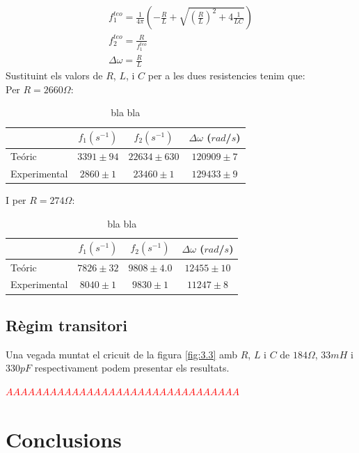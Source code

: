 \documentclass[a4paper,10.5pt]{report}
\begin{document}
\begin{eqnarray}
	f_1^{teo} = \frac{1}{4\pi}(-\frac{R}{L} + \sqrt{(\frac{R}{L})^2 + 4\frac{1}{LC}})\\
	f_2^{teo} = \frac{R}{f_1^{teo}}\\
	\Delta \omega = \frac{R}{L}
\end{eqnarray}
Sustituint els valors de $R$, $L$, i $C$ per a les dues resistencies tenim que:\\
Per $R = 2660\Omega$:\\
\begin{table}[H]
	\centering
	\renewcommand{\arraystretch}{1.2}
	\caption{bla bla}
	\begin{tabular}{lccc}
		\toprule
		& $f_1 (s^{-1})$ & $f_2 (s^{-1})$ & $\Delta \omega$ ($rad$/$s$) \\ 
		\midrule
		Teóric & $3391 \pm 94$ & $22634 \pm 630$ & $120909 \pm 7$\\ 
		Experimental & $2860 \pm 1$ & $23460 \pm 1$ & $129433 \pm 9$\\ 
		\bottomrule
	\end{tabular}
\end{table}

I per $R = 274\Omega$:
\begin{table}[H]
	\centering
	\renewcommand{\arraystretch}{1.2}
	\caption{bla bla}
	\begin{tabular}{lccc}
		\toprule
		& $f_1 (s^{-1})$ & $f_2 (s^{-1})$ & $\Delta \omega$ ($rad$/$s$) \\ 
		\midrule
		Teóric & $7826 \pm 32$ & $9808 \pm 4.0$ & $12455 \pm 10$\\ 
		Experimental & $8040 \pm 1$ & $9830 \pm 1$ & $11247 \pm 8$\\ 
		\bottomrule
	\end{tabular}
\end{table}

\subsection{Règim transitori}
Una vegada muntat el cricuit de la figura \ref{fig:3.3} amb $R$, $L$ i $C$ de $184\Omega$, $33mH$ i $330pF$ respectivament podem presentar els resultats. 

\textcolor{red}{$AAAAAAAAAAAAAAAAAAAAAAAAAAAAAAAA$}

\section{Conclusions}
\end{document}
